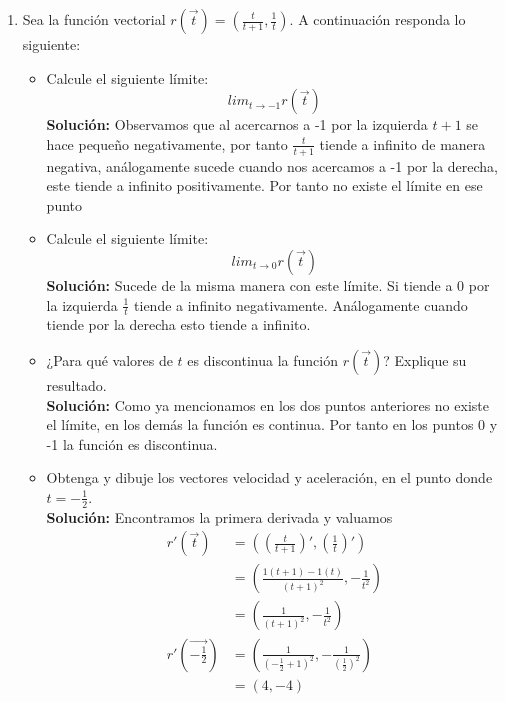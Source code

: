 \documentclass[10pt,letterpaper,fleqn]{article}
\begin{document}
    \begin{enumerate}
        \item Sea la función vectorial $r(\overrightarrow{t}) = \left(\frac{t}{t+1},\frac{1}{t}\right)$. A continuación responda lo siguiente:
        \begin{itemize}
        	\item Calcule el siguiente límite: $$ lim_{t\rightarrow -1}r(\overrightarrow{t})$$
        	\textbf{Solución:} Observamos que al acercarnos a -1 por la izquierda $t+1$ se hace pequeño negativamente, por tanto 
        	$\frac{t}{t+1}$ tiende a infinito de manera negativa, análogamente sucede cuando nos acercamos a -1 por la derecha, este
        	tiende a infinito positivamente. Por tanto no existe el límite en ese punto


        	\item Calcule el siguiente límite: $$ lim_{t\rightarrow 0}r(\overrightarrow{t})$$
        	\textbf{Solución:} Sucede de la misma manera con este límite. Si tiende a 0 por la izquierda $\frac{1}{t}$ tiende a infinito
        	negativamente. Análogamente cuando tiende por la derecha esto tiende a infinito.

        	\item ¿Para qué valores de $t$ es discontinua la función $r(\overrightarrow{t})$? Explique su resultado.\\
        	\textbf{Solución:} Como ya mencionamos en los dos puntos anteriores no existe el límite, en los demás la función
        	es continua. Por tanto en los puntos 0 y -1 la función es discontinua.

        	\item Obtenga y dibuje los vectores velocidad y aceleración, en el punto donde $t = -\frac{1}{2}$.\\
        	\textbf{Solución:} Encontramos la primera derivada y valuamos
        	\begin{equation*}
        	\begin{split}
        		r'(\overrightarrow{t}) &= \left(\left(\frac{t}{t+1}\right)',(\frac{1}{t})'\right) \\
        							   &= \left(\frac{1(t+1) - 1(t)}{(t+1)^2},-\frac{1}{t^2}\right) \\
        							   &= \left(\frac{1}{(t+1)^2},-\frac{1}{t^2}\right) \\
				r'(\overrightarrow{-\frac{1}{2}}) &= \left(\frac{1}{(-\frac{1}{2}+1)^2},-\frac{1}{(\frac{1}{2})^2}\right) \\        							   &= \left(4,-4\right)
        	\end{split}
        	\end{equation*}


\end{itemize}
\end{enumerate}
\end{document}
